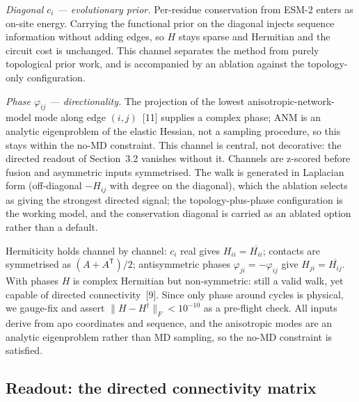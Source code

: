 \documentclass[10pt,a4paper]{article}
\begin{document}
\emph{Diagonal $c_i$ --- evolutionary prior.} Per-residue conservation from ESM-2
enters as on-site energy. Carrying the functional prior on the diagonal injects sequence information
without adding edges, so $H$ stays sparse and Hermitian and the circuit cost is unchanged. This
channel separates the method from purely topological prior work, and is accompanied by an ablation
against the topology-only configuration.

\emph{Phase $\varphi_{ij}$ --- directionality.} The projection of the lowest
anisotropic-network-model mode along edge $(i,j)$~[11] supplies a complex phase; ANM is
an analytic eigenproblem of the elastic Hessian, not a sampling procedure, so this stays within the
no-MD constraint. This channel is central, not decorative: the directed readout of Section~3.2
vanishes without it. Channels are z-scored before fusion and asymmetric inputs symmetrised. The walk
is generated in Laplacian form (off-diagonal $-H_{ij}$ with degree on the diagonal), which the
ablation selects as giving the strongest directed signal; the topology-plus-phase configuration is
the working model, and the conservation diagonal is carried as an ablated option rather than a
default.

Hermiticity holds channel by channel: $c_i$ real gives $H_{ii} = \overline{H_{ii}}$; contacts are
symmetrised as $(A + A^{\mathsf T})/2$; antisymmetric phases $\varphi_{ji} = -\varphi_{ij}$ give
$H_{ji} = \overline{H_{ij}}$. With phases $H$ is complex Hermitian but non-symmetric: still a valid
walk, yet capable of directed connectivity~[9]. Since only phase around cycles is
physical, we gauge-fix and assert $\lVert H - H^{\dagger}\rVert_F < 10^{-10}$ as a pre-flight check.
All inputs derive from apo coordinates and sequence, and the anisotropic modes are an analytic
eigenproblem rather than MD sampling, so the no-MD constraint is satisfied.

\subsection{Readout: the directed connectivity matrix}
\end{document}
